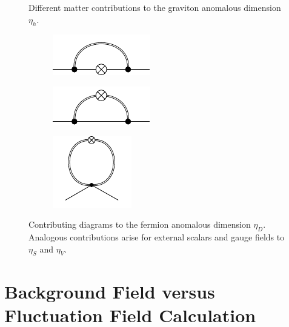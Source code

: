 \begin{figure}[t]
\begin{subfigure}{0.3\textwidth}
 \end{subfigure} 
 \hfill
 \caption{Different matter contributions to the graviton anomalous dimension $\eta_h$.}	
 \end{figure}
 

 
  \begin{figure}[t]
 \centering
 \hfill
 \begin{subfigure}{0.3\textwidth} 
	\includegraphics[width=\textwidth]{figs/TikZ/graviton_fluctuations1}
 \end{subfigure}
 \hfill
 \begin{subfigure}{0.3\textwidth}
 \vspace{-3.5pt}
 	\includegraphics[width=\textwidth]{figs/TikZ/graviton_fluctuations2}
 \end{subfigure} 
 \hfill
 \begin{subfigure}{0.3\textwidth} 
 	\includegraphics[scale = 1.5]{figs/TikZ/graviton_fluctuations3}
 \end{subfigure} 
 \hfill
 \caption[Contributing diagrams to the fermion anomalous dimension $\eta_D$.]{Contributing diagrams to the fermion anomalous dimension $\eta_D$. Analogous contributions arise for external scalars and gauge fields to $\eta_S$ and $\eta_V$.} 	
 \end{figure}
 
 \section{Background Field versus Fluctuation Field Calculation}

 